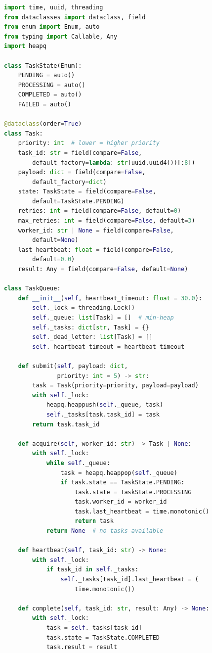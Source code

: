 \begin{lstlisting}[language=Python]
import time, uuid, threading
from dataclasses import dataclass, field
from enum import Enum, auto
from typing import Callable, Any
import heapq

class TaskState(Enum):
    PENDING = auto()
    PROCESSING = auto()
    COMPLETED = auto()
    FAILED = auto()

@dataclass(order=True)
class Task:
    priority: int  # lower = higher priority
    task_id: str = field(compare=False,
        default_factory=lambda: str(uuid.uuid4())[:8])
    payload: dict = field(compare=False,
        default_factory=dict)
    state: TaskState = field(compare=False,
        default=TaskState.PENDING)
    retries: int = field(compare=False, default=0)
    max_retries: int = field(compare=False, default=3)
    worker_id: str | None = field(compare=False,
        default=None)
    last_heartbeat: float = field(compare=False,
        default=0.0)
    result: Any = field(compare=False, default=None)

class TaskQueue:
    def __init__(self, heartbeat_timeout: float = 30.0):
        self._lock = threading.Lock()
        self._queue: list[Task] = []  # min-heap
        self._tasks: dict[str, Task] = {}
        self._dead_letter: list[Task] = []
        self._heartbeat_timeout = heartbeat_timeout

    def submit(self, payload: dict,
               priority: int = 5) -> str:
        task = Task(priority=priority, payload=payload)
        with self._lock:
            heapq.heappush(self._queue, task)
            self._tasks[task.task_id] = task
        return task.task_id

    def acquire(self, worker_id: str) -> Task | None:
        with self._lock:
            while self._queue:
                task = heapq.heappop(self._queue)
                if task.state == TaskState.PENDING:
                    task.state = TaskState.PROCESSING
                    task.worker_id = worker_id
                    task.last_heartbeat = time.monotonic()
                    return task
            return None  # no tasks available

    def heartbeat(self, task_id: str) -> None:
        with self._lock:
            if task_id in self._tasks:
                self._tasks[task_id].last_heartbeat = (
                    time.monotonic())

    def complete(self, task_id: str, result: Any) -> None:
        with self._lock:
            task = self._tasks[task_id]
            task.state = TaskState.COMPLETED
            task.result = result


\end{lstlisting}
